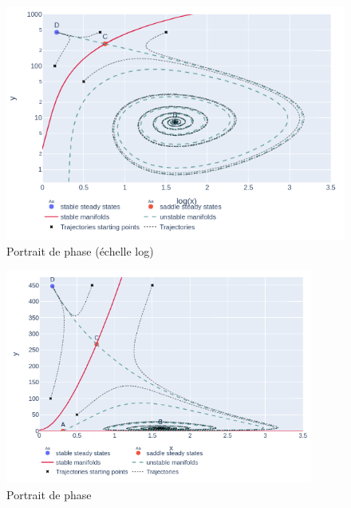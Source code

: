 \documentclass[12pt]{article}
\begin{document}
\begin{figure}[!hb]
         \centering
         \includegraphics[width=\textwidth]{figures/fig_phase_portrait_log.png}
         \caption{Portrait de phase (échelle log)}
         \label{fig::phase_portrait_log}
\end{figure}

\begin{figure}[!ht]
    \centering
         \includegraphics[width=0.9\textwidth]{figures/fig_phase_portrait.png}
         \caption{Portrait de phase}
         \label{fig::phase_portrait}
\end{figure}
\end{document}
